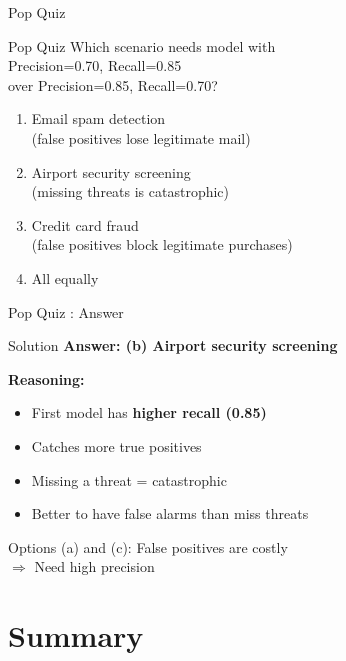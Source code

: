 \documentclass{beamer}
\newcounter{popquiz}
\begin{document}
\begin{frame}{Pop Quiz \thepopquiz}
\begin{popquizbox}{Pop Quiz \thepopquiz}
Which scenario needs model with \\
Precision=0.70, Recall=0.85 \\
over Precision=0.85, Recall=0.70?
\end{popquizbox}

\vspace{0.3cm}

\begin{enumerate}
    \item Email spam detection \\
          (false positives lose legitimate mail)
    \item Airport security screening \\
          (missing threats is catastrophic)
    \item Credit card fraud \\
          (false positives block legitimate purchases)
    \item All equally
\end{enumerate}
\end{frame}

\begin{frame}{Pop Quiz \thepopquiz: Answer}
\begin{examplebox}{Solution}
\textbf{Answer: (b) Airport security screening}
\end{examplebox}

\vspace{0.3cm}

\textbf{Reasoning:}
\begin{itemize}
    \item First model has \textbf{higher recall (0.85)}
    \item Catches more true positives
    \item Missing a threat = catastrophic
    \item Better to have false alarms than miss threats
\end{itemize}

\vspace{0.3cm}

Options (a) and (c): False positives are costly \\
$\Rightarrow$ Need high precision
\end{frame}

\section{Summary}
\end{document}
